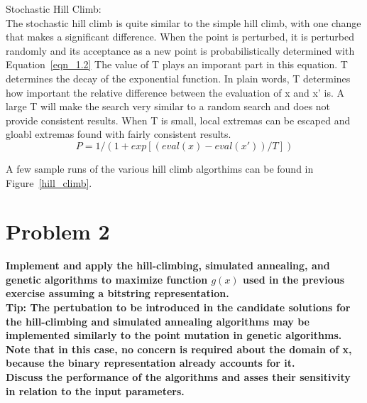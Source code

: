 Stochastic Hill Climb: \\

The stochastic hill climb is quite similar to the simple hill climb, with one change that makes a significant difference. When the point is perturbed, it is perturbed randomly and its acceptance as a new point is probabilistically determined with Equation~\ref{eqn_1.2} The value of T plays an imporant part in this equation. T determines the decay of the exponential function. In plain words, T determines how important the relative difference between the evaluation of x and x' is. A large T will make the search very similar to a random search and does not provide consistent results. When T is small, local extremas can be escaped and gloabl extremas found with fairly consistent results.  \\

\begin{equation}\label{eqn_1.2}
P = 1 / ( 1 + exp[ ( eval(x) - eval(x') ) / T ] )
\end{equation}

A few sample runs of the various hill climb algorthims can be found in Figure~\ref{hill_climb}.




\newpage
\section{Problem 2}
\textbf{Implement and apply the hill-climbing, simulated annealing, and genetic algorithms to maximize function $g(x)$ used in the previous exercise assuming a bitstring representation.} \newline \\
\textbf{Tip: The pertubation to be introduced in the candidate solutions for the hill-climbing and simulated annealing algorithms may be implemented similarly to the point mutation in genetic algorithms. Note that in this case, no concern is required about the domain of x, because the binary representation already accounts for it.} \newline \\
\textbf{Discuss the performance of the algorithms and asses their sensitivity in relation to the input parameters.}


